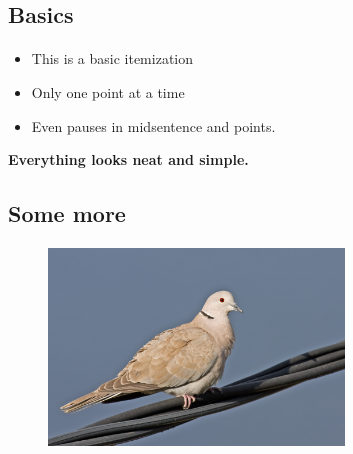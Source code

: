 \subsection{Basics}
\begin{frame}{\insertsection} %
	\framesubtitle{\insertsubsection} %
	\begin{itemize}[<+->] %
		\item This is a basic itemization
		\item Only one point at a time
		\item Even \pause pauses \pause in midsentence and \pause points. %
    \end{itemize}
    \pause \textbf{Everything looks neat and simple.}
\end{frame}

\subsection{Some more}
\begin{frame}{\insertsection}
	\framesubtitle{\insertsubsection}
	\begin{figure}[h]
		\centering
		\includegraphics[width=0.7\textwidth,]{Collared_Dove.jpg}
	\end{figure}
\end{frame}